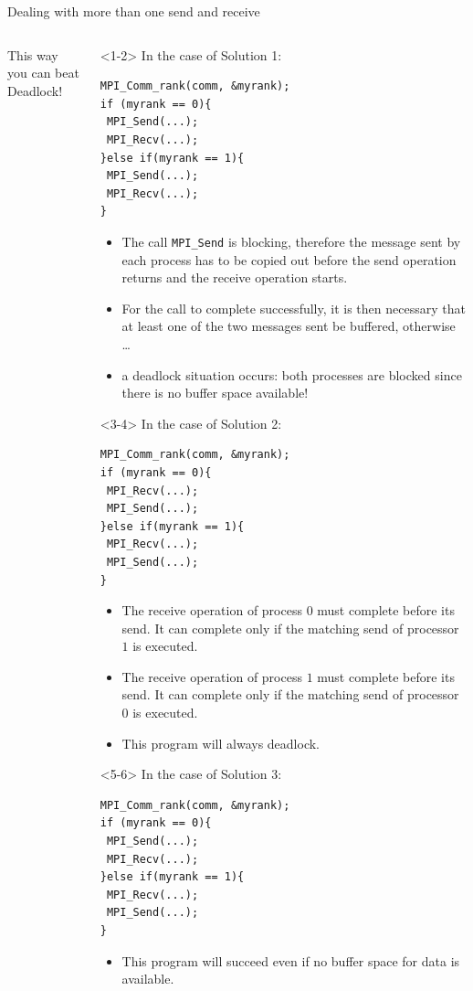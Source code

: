 \documentclass[xcolor={svgnames,usenames}]{beamer}
\begin{document}
\begin{frame}[fragile]{Dealing with more than one send and receive}
\begin{columns}
\begin{column}{0.30\columnwidth}
{This way you can beat Deadlock!
}
\end{column}
\begin{column}{0.70\columnwidth}
\begin{onlyenv}<1-2>
\noindent In the case of Solution 1:
{\footnotesize
\begin{verbatim}
MPI_Comm_rank(comm, &myrank);
if (myrank == 0){
 MPI_Send(...);
 MPI_Recv(...);
}else if(myrank == 1){
 MPI_Send(...); 
 MPI_Recv(...);
}
\end{verbatim}
}
\begin{itemize}
	\item The call \texttt{MPI_Send} is blocking, therefore the message sent by each process has to be copied out before the send operation returns
	and the receive operation starts.
	\item For the call to complete successfully, it is then necessary that \alert{at least one of the two messages sent be buffered}, otherwise \ldots
	\item a deadlock situation occurs: both processes are blocked since there is no buffer space available!
\end{itemize}
\end{onlyenv}
\begin{onlyenv}<3-4>
\noindent In the case of Solution 2:
{\footnotesize
\begin{verbatim}
MPI_Comm_rank(comm, &myrank);
if (myrank == 0){
 MPI_Recv(...);
 MPI_Send(...);
}else if(myrank == 1){
 MPI_Recv(...);
 MPI_Send(...); 
}
\end{verbatim}
}
\begin{itemize}
	\item The receive operation of process $0$ must complete before its send. It can complete
	\alert{only if} the matching send of processor $1$ is executed.
	\item The receive operation of process $1$ must complete before its send. It can complete
	\alert{only if} the matching send of processor $0$ is executed.
	\item This program will always deadlock.
\end{itemize}
\end{onlyenv}
\begin{onlyenv}<5-6>
\noindent In the case of Solution 3:
{\footnotesize
\begin{verbatim}
MPI_Comm_rank(comm, &myrank);
if (myrank == 0){
 MPI_Send(...);
 MPI_Recv(...);
}else if(myrank == 1){
 MPI_Recv(...);
 MPI_Send(...); 
}
\end{verbatim}
}
\begin{itemize}
\item This program will succeed even if no buffer space for data is available.
\end{itemize}
\end{onlyenv}
\end{column}
\end{columns}	
\end{frame}
\end{document}
